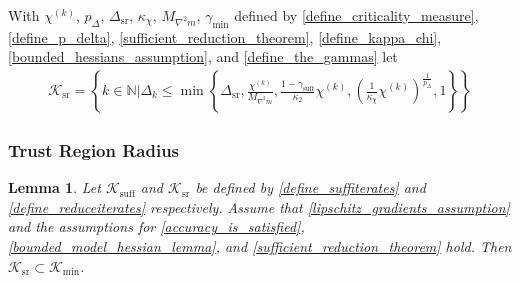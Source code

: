 \documentclass{article}
\newtheorem{lemma}[theorem]{Lemma}
\theoremstyle{case}
\numberwithin{theorem}{subsection}
\newcommand{\chik}{{\chi^{(k)}}}
\newcommand{\dk}{\Delta_k}
\newcommand{\dsr}{{\Delta_{\textrm{sr}}}}
\newcommand{\gammabi}{\gamma_{\textrm{suff}}}
\newcommand{\gammasm}{\gamma_{\textrm{min}}}
\newcommand{\maxmodelhessian}{{M_{\nabla^2 m}}}
\newcommand{\naturals}{\mathbb N}
\newcommand{\suffiterates}{{\mathcal K_{\textrm{suff}}}}
\newcommand{\miniterates}{{\mathcal K_{\textrm{min}}}}
\newcommand{\reduceiterates}{{\mathcal K_{\textrm{sr}}}}
\newcommand{\theirc}{{\kappa_2}}
\begin{document}
With
$\chik$, $p_{\Delta}$, $\dsr$, $\kappa_{\chi}$, $\maxmodelhessian$, $\gammasm$
defined by 
\cref{define_criticality_measure}, \cref{define_p_delta}, \cref{sufficient_reduction_theorem}, \cref{define_kappa_chi}, \cref{bounded_hessians_assumption}, and \cref{define_the_gammas}
let
\begin{align}
\label{define_reduceiterates}
\reduceiterates = \left \{ k \in \naturals \bigg| \dk \le \min \left\{ 
\dsr, 
\frac {\chik}{\maxmodelhessian}, 
\frac{1-\gammabi}{\theirc}\chik,
\left(\frac 1 {\kappa_{\chi}}  \chik\right)^{\frac 1 {p_{\Delta}}}, 
1
\right\} \right \} 
\end{align}

\subsubsection{Trust Region Radius}

\begin{lemma}
\label{mathcal_k_subset_bar_s}
Let $\suffiterates$ and $\reduceiterates$ be defined by \cref{define_suffiterates} and \cref{define_reduceiterates} respectively.
Assume that 
\cref{lipschitz_gradients_assumption}
and the assumptions for
\cref{accuracy_is_satisfied},
\cref{bounded_model_hessian_lemma},
and \cref{sufficient_reduction_theorem}
hold.
Then $\reduceiterates \subset \miniterates$.
\end{lemma}
 
\end{document}
